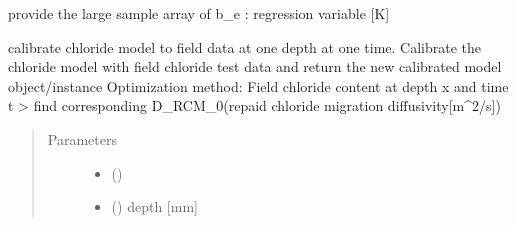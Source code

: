 \documentclass[letterpaper,10pt,english]{sphinxmanual}
\begin{document}

\begin{fulllineitems}
\label{\detokenize{chloride:chloride.b_e}}
\sphinxAtStartPar
provide the large sample array of b\_e : regression variable {[}K{]}

\end{fulllineitems}


\begin{fulllineitems}
\label{\detokenize{chloride:chloride.calibrate_chloride_f}}
\sphinxAtStartPar
calibrate chloride model to field data at one depth at one time.
Calibrate the chloride model with field chloride test data and return the new calibrated model object/instance
Optimization method:  Field chloride content at depth x and time t \sphinxhyphen{}\textgreater{} find corresponding D\_RCM\_0(repaid chloride migration diffusivity{[}m\textasciicircum{}2/s{]})
\begin{quote}\begin{description}
\item[{Parameters}] \leavevmode\begin{itemize}
\item {} 
\sphinxAtStartPar
{} (\sphinxstyleliteralemphasis{\sphinxupquote{ (}}\sphinxstyleliteralemphasis{\sphinxupquote{)}}) \textendash{} 

\item {} 
\sphinxAtStartPar
{} () \textendash{} depth {[}mm{]}


\end{itemize}
\end{description}
\end{quote}
\end{fulllineitems}
\end{document}
